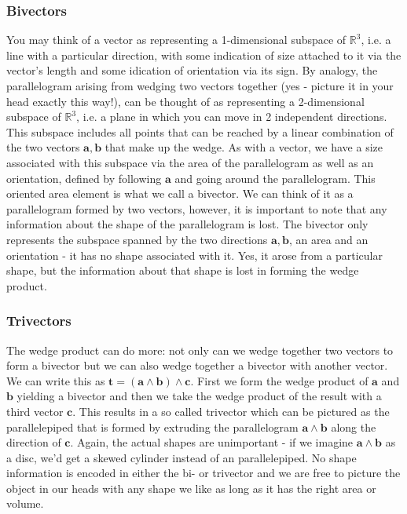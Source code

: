 \subsubsection{Bivectors}
You may think of a vector as representing a 1-dimensional subspace of $\mathbb{R}^3$, i.e. a line with a particular direction, with some indication of size attached to it via the vector's length and some idication of orientation via its sign. By analogy, the parallelogram arising from wedging two vectors together (yes - picture it in your head exactly this way!), can be thought of as representing a 2-dimensional subspace of $\mathbb{R}^3$, i.e. a plane in which you can move in 2 independent directions. This subspace includes all points that can be reached by a linear combination of the two vectors $\mathbf{a,b}$ that make up the wedge. As with a vector, we have a size associated with this subspace via the area of the parallelogram as well as an orientation, defined by following $\mathbf{a}$ and going around the parallelogram. This oriented area element is what we call a bivector. We can think of it as a parallelogram formed by two vectors, however, it is important to note that any information about the shape of the parallelogram is lost. The bivector only represents the subspace spanned by the two directions $\mathbf{a,b}$, an area and an orientation - it has no shape associated with it. Yes, it arose from a particular shape, but the information about that shape is lost in forming the wedge product.

\subsubsection{Trivectors}
The wedge product can do more: not only can we wedge together two vectors to form a bivector but we can also wedge together a bivector with another vector. We can write this as $\mathbf{t = (a \wedge b) \wedge c}$. First we form the wedge product of $\mathbf{a}$ and  $\mathbf{b}$ yielding a bivector and then we take the wedge product of the result with a third vector $\mathbf{c}$. This results in a so called trivector which can be pictured as the parallelepiped that is formed by extruding the parallelogram $\mathbf{a \wedge b}$ along the direction of $\mathbf{c}$. Again, the actual shapes are unimportant - if we imagine $\mathbf{a \wedge b}$ as a disc, we'd get a skewed cylinder instead of an parallelepiped. No shape information is encoded in either the bi- or trivector and we are free to picture the object in our heads with any shape we like as long as it has the right area or volume.

